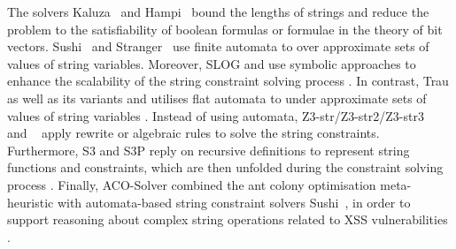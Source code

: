 The solvers Kaluza~\cite{Berkeley-JavaScript} and Hampi~\cite{HAMPI}  bound the lengths of strings and reduce the problem to the satisfiability of boolean formulas or formulae in the theory of bit vectors. Sushi~\cite{sushi} and Stranger~\cite{YABI14,Stranger} use finite automata to over approximate sets of values of string variables. Moreover, SLOG and {\slent}  use symbolic approaches to enhance the scalability of the string constraint solving process \cite{fang-yu-circuits,WC+18}. In contrast, Trau as well as its variants {\zthreetrau} and {\trauplus} utilises flat automata to under approximate sets of values of string variables \cite{Abdulla17,AbdullaACDHRR18-trau,AbdullaA+19,Z3-trau}.
%
Instead of using automata, Z3-str/Z3-str2/Z3-str3~\cite{Z3-str,Z3-str2,Z3-str3} and {\cvc}~\cite{cvc4,ReynoldsWBBLT17} apply rewrite or algebraic rules to solve the string constraints.
%
Furthermore, S3 and S3P reply on recursive definitions to represent string functions and constraints, which are then unfolded during the constraint solving process \cite{S3,TCJ16}.
%
Finally, ACO-Solver combined the ant colony optimisation meta-heuristic with automata-based string constraint solvers Sushi~\cite{sushi},  in order to support reasoning about complex string operations related to XSS vulnerabilities \cite{ThomeSBB17}.
%



